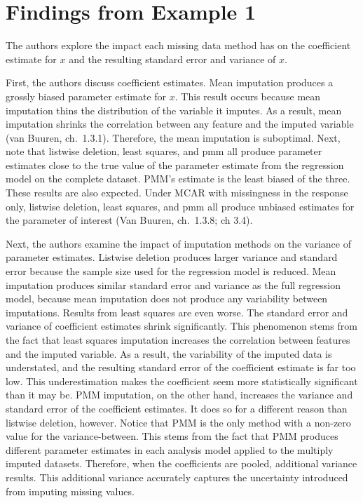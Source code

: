 \documentclass[12pt,oneside]{chicagocapstone}
\begin{document}
\section*{Findings from Example 1}\label{findings-from-example-1}

The authors explore the impact each missing data method has on the
coefficient estimate for \(x\) and the resulting standard error and
variance of \(x\).

First, the authors discuss coefficient estimates. Mean imputation
produces a grossly biased parameter estimate for \(x\). This result
occurs because mean imputation thins the distribution of the variable it
imputes. As a result, mean imputation shrinks the correlation between
any feature and the imputed variable (van Buuren, ch.~1.3.1). Therefore,
the mean imputation is suboptimal. Next, note that listwise deletion,
least squares, and pmm all produce parameter estimates close to the true
value of the parameter estimate from the regression model on the
complete dataset. PMM's estimate is the least biased of the three. These
results are also expected. Under MCAR with missingness in the response
only, listwise deletion, least squares, and pmm all produce unbiased
estimates for the parameter of interest (Van Buuren, ch.~1.3.8; ch 3.4).

Next, the authors examine the impact of imputation methods on the
variance of parameter estimates. Listwise deletion produces larger
variance and standard error because the sample size used for the
regression model is reduced. Mean imputation produces similar standard
error and variance as the full regression model, because mean imputation
does not produce any variability between imputations. Results from least
squares are even worse. The standard error and variance of coefficient
estimates shrink significantly. This phenomenon stems from the fact that
least squares imputation increases the correlation between features and
the imputed variable. As a result, the variability of the imputed data
is understated, and the resulting standard error of the coefficient
estimate is far too low. This underestimation makes the coefficient seem
more statistically significant than it may be. PMM imputation, on the
other hand, increases the variance and standard error of the coefficient
estimates. It does so for a different reason than listwise deletion,
however. Notice that PMM is the only method with a non-zero value for
the variance-between. This stems from the fact that PMM produces
different parameter estimates in each analysis model applied to the
multiply imputed datasets. Therefore, when the coefficients are pooled,
additional variance results. This additional variance accurately
captures the uncertainty introduced from imputing missing values.
\end{document}
